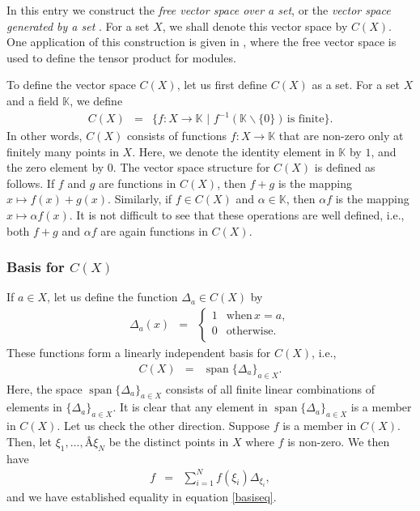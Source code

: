 \documentclass[12pt]{article}
\begin{document}
\newcommand{\sK}[0]{\mathbb{K}}
\newcommand{\lsp}[0]{\mathop{\mathrm{span}}}

In this entry we construct
the \emph{free vector space over a set}, or
the \emph{vector space generated by a set} \cite{greub}. 
For a set $X$, we shall denote this vector space by $C(X)$. 
One application of this construction is given in \cite{madsen},
where the free  vector space is used to define the tensor product for 
modules. 

To define the vector space $C(X)$, let us first define $C(X)$ as a
set. For a set $X$  and a field $\sK$, we define
\begin{eqnarray*}
C(X) &=& \{ f:X\to \sK\,\, |\,\, f^{-1}(\sK\backslash\{0\}) \, \mbox{is finite} \}.
\end{eqnarray*}
In other words, $C(X)$ consists of functions $f:X\to \sK$ 
that are non-zero only
at finitely many points in $X$. 
Here, we denote the identity element in $\sK$ by $1$, and 
the zero element by $0$. 
The vector space structure for $C(X)$
is defined as follows. If $f$ and $g$ are
functions in $C(X)$, then $f+g$ is the mapping $x\mapsto f(x) + g(x)$. 
Similarly, if $f\in C(X)$ and $\alpha \in \sK$, then 
$\alpha f$ is the mapping $x\mapsto \alpha f(x)$. It is not difficult to
see that these operations are well defined, i.e., both $f+g$ and 
$\alpha f$ are again functions in $C(X)$. 

\subsubsection{Basis for $C(X)$} 
If $a\in X$, 
let us define the function $\Delta_a \in C(X)$ by 
\begin{eqnarray*}
\Delta_a(x)&=& \left\{ \begin {array}{ll} 
  1 & \mbox{when} \, x=a, \\
  0 & \mbox{otherwise.} \\
  \end{array} \right.
\end{eqnarray*}
These functions form a linearly independent basis for $C(X)$, i.e.,
\begin{eqnarray}
\label{basiseq}
C(X) &=& \lsp\{ \Delta_a\}_{a\in X}.
\end{eqnarray}
Here, the space $\lsp\{ \Delta_a\}_{a\in X}$ consists of all
finite linear combinations of elements in  $\{ \Delta_a\}_{a\in X}$.
It is clear that any element in $\lsp\{ \Delta_a\}_{a\in X}$
is a member in $C(X)$. 
Let us check the other direction. Suppose $f$ is a member in $C(X)$. 
Then, let
$\xi_1, \ldots,Â \xi_N$ be the distinct points in $X$ where $f$ is non-zero. 
We then have
\begin{eqnarray*}
f&=&\sum_{i=1}^Nf(\xi_i) \Delta_{\xi_i},
\end{eqnarray*}
and we have established equality in equation \ref{basiseq}.
\end{document}
